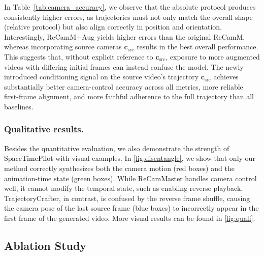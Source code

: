 \documentclass[10pt,twocolumn,letterpaper]{article}
\newcommand{\nameCOLOR}[1]{\textcolor{black}{#1}}
\newcommand{\nameMethod}{\nameCOLOR{\mbox{SpaceTimePilot}}\xspace}
\newcommand{\recammaster}{\nameCOLOR{\mbox{ReCamMaster}}\xspace}
\newcommand{\src}{\text{src}}
\newcommand{\camera}{\mathbf{c}}
\begin{document}
In Table~\ref{tab:camera_accuracy}, we observe that the absolute protocol produces consistently higher errors, as trajectories must not only match the overall shape (relative protocol) but also align correctly in position and orientation.
Interestingly, ReCamM+Aug yields higher errors than the original ReCamM, whereas incorporating source cameras $\camera_\src$ results in the best overall performance.
This suggests that, without explicit reference to $\camera_\src$, exposure to more augmented videos with differing initial frames can instead confuse the model.
The newly introduced conditioning signal on the source video’s trajectory $\camera_\src$ achieves substantially better camera-control accuracy across all metrics, more reliable first-frame alignment, and more faithful adherence to the full trajectory than all baselines. 

\subsubsection{Qualitative results.}
Besides the quantitative evaluation, we also demonstrate the strength of \nameMethod with visual examples.
In \cref{fig:disentangle}, we show that only our method correctly synthesizes both the camera motion (red boxes) and the animation-time state (green boxes). While \recammaster handles camera control well, it cannot modify the temporal state, such as enabling reverse playback. TrajectoryCrafter, in contrast, is confused by the reverse frame shuffle, causing the camera pose of the last source frame (blue boxes) to incorrectly appear in the first frame of the generated video. More visual results can be found in \cref{fig:quali}.
\subsection{Ablation Study}
\end{document}
